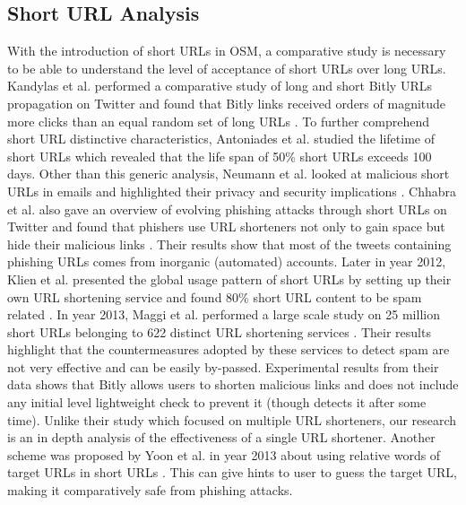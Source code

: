 \documentclass[conference]{IEEEtran}
\begin{document}
\subsection{Short URL Analysis}
\vspace{4pt}
With the introduction of short URLs in OSM, a comparative study is necessary to be able to understand the level of acceptance of short URLs over long URLs. Kandylas et al. performed a comparative study of long and short Bitly URLs propagation on Twitter and found that Bitly links received orders of magnitude more clicks than an equal random set of long URLs \cite{5}.  
To further comprehend short URL distinctive characteristics, Antoniades et al. studied the lifetime of short URLs which revealed that the life span of 50\% short URLs exceeds 100 days. 
Other than this generic analysis, Neumann et al. looked at malicious short URLs in emails and highlighted their privacy and security implications \cite{1}. Chhabra et al. also gave an overview of evolving phishing attacks through short URLs on Twitter and found that phishers use URL shorteners not only to gain space but hide their malicious links \cite{13}. Their results show that most of the tweets containing phishing URLs comes from inorganic (automated) accounts. Later in year 2012, Klien et al. presented the global usage pattern of short URLs by setting up their own URL shortening service and found 80\% short URL content to be spam related \cite{2}. 
In year 2013, Maggi et al. performed a large scale study on 25 million short URLs belonging to 622 distinct URL shortening services \cite{4}. Their results highlight that the countermeasures adopted by these services to detect spam are not very effective and can be easily by-passed. Experimental results from their data shows that Bitly allows users to shorten malicious links and does not include any initial level lightweight check to prevent it (though detects it after some time). Unlike their study which focused on multiple URL shorteners, our research is an in depth analysis of the effectiveness of a single URL shortener. Another scheme was proposed by Yoon et al. in year 2013 about using relative words of target URLs in short URLs \cite{14}. This can give hints to user to guess the target URL, making it comparatively safe from phishing attacks.
\end{document}
